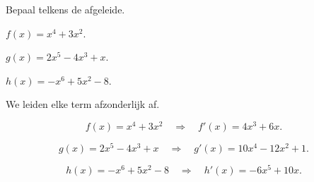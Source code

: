\documentclass{ximera}
\begin{document}
\begin{oefening}{\oefB\ESS}

Bepaal telkens de afgeleide.

\begin{question}

\(
f(x)=x^4+3x^2.
\)

\end{question}

\begin{question}

\(
g(x)=2x^5-4x^3+x.
\)

\end{question}

\begin{question}

\(
h(x)=-x^6+5x^2-8.
\)

\end{question}

\begin{oplossing}

We leiden elke term afzonderlijk af.

\[
f(x)=x^4+3x^2
\quad\Longrightarrow\quad
\boxed{f'(x)=4x^3+6x}.
\]

\[
g(x)=2x^5-4x^3+x
\quad\Longrightarrow\quad
\boxed{g'(x)=10x^4-12x^2+1}.
\]

\[
h(x)=-x^6+5x^2-8
\quad\Longrightarrow\quad
\boxed{h'(x)=-6x^5+10x}.
\]

\end{oplossing}

\end{oefening}


\end{document}

